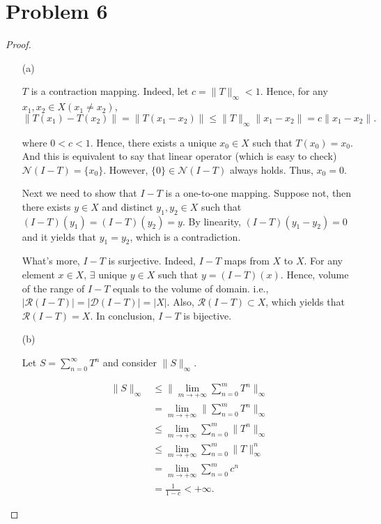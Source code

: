 \documentclass[12pt]{article}
\begin{document}
\section*{Problem 6}

\begin{proof}

\begin{enumerate}

\item [(a)]

$T$ is a contraction mapping. Indeed, let $ c = \|T\|_\infty < 1$. Hence, for any $x_1, x_2 \in X (x_1 \neq x_2)$, 
$$
\|T(x_1) - T(x_2)\| = \|T(x_1 - x_2)\| \leqslant \|T\|_\infty\|x_1 - x_2\| = c\|x_1 - x_2\|.
$$

where $0<c<1$. Hence, there exists a unique $x_0\in X$ such that $T(x_0) = x_0$. And this is equivalent to say that linear operator (which is easy to check) $ \mathcal N (I-T) = \{x_0\}$. However, $\{0\}\in \mathcal N (I-T)$ always holds. Thus, $x_0 = 0$. 

Next we need to show that $I-T$ is a one-to-one mapping. Suppose not, then there exists $y\in X$ and distinct $y_1, y_2 \in X$ such that $(I-T)(y_1) = (I-T)(y_2) = y $. By linearity, $(I-T)(y_1 - y_2) = 0$ and it yields that $y_1 = y_2$, which is a contradiction. 

What's more, $I-T$ is surjective. Indeed, $I - T$ maps from $X$ to $X$. For any element $x\in X$, $\exists$ unique $y\in X$ such that $y = (I-T)(x)$. Hence, volume of the range of $I-T$ equals to the volume of domain. i.e., $|\mathcal R(I-T)| = |\mathcal D(I-T)| = |X|$. Also, $\mathcal R(I-T) \subset X$, which yields that $\mathcal R(I-T) = X$. In conclusion, $I-T$ is bijective. 

\item [(b)]

Let $S = \sum_{n=0}^\infty T^n$ and consider $\|S\|_\infty$.

$$
\begin{aligned}
\|S\|_\infty & \leqslant \|\lim_{m\rightarrow +\infty}\sum_{n=0}^mT^n\|_\infty \\
& =  \lim_{m\rightarrow +\infty}\|\sum_{n=0}^mT^n\|_\infty \\
& \leqslant \lim_{m\rightarrow +\infty}\sum_{n=0}^m \|T^n\|_\infty \\
& \leqslant \lim_{m\rightarrow +\infty}\sum_{n=0}^m\|T\|^n_\infty \\
& = \lim_{m\rightarrow +\infty}\sum_{n=0}^m c^n \\
& = \frac{1}{1-c} < +\infty.
\end{aligned}
$$


\end{enumerate}
\end{proof}
\end{document}
